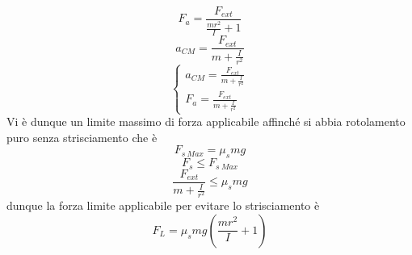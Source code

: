 \documentclass[twoside]{article}
\begin{document}
\begin{equation*}
  F_{a} = \displaystyle \frac{F_{ext}}{\displaystyle \frac{mr^2}{I} +1}
\end{equation*}
\begin{equation*}
  a_{CM} = \displaystyle \frac{F_{ext}}{m + \displaystyle \frac{I}{r^2}}
\end{equation*}
\begin{equation}
  \boxed{
    \begin{cases}
      \displaystyle a_{CM} = \frac{F_{ext}}{m + \frac{I}{r^2}} \\
      \displaystyle F_{a} = \frac{F_{ext}}{m + \frac{I}{r^2}}
    \end{cases}
  }
\end{equation}
Vi è dunque un limite massimo di forza applicabile affinché si abbia rotolamento puro senza strisciamento che è
\begin{equation*}
  F_{s\ Max} = \mu_s mg
\end{equation*}
\begin{equation*}
  F_{s} \leq F_{s\ Max}
\end{equation*}
\begin{equation*}
  \frac{F_{ext}}{m + \frac{I}{r^2}} \leq \mu_s mg
\end{equation*}
dunque la forza limite applicabile per evitare lo strisciamento è
\begin{equation}
  \boxed{F_{L} = \mu_s mg (\frac{mr^2}{I}+1)}
\end{equation}
\end{document}

